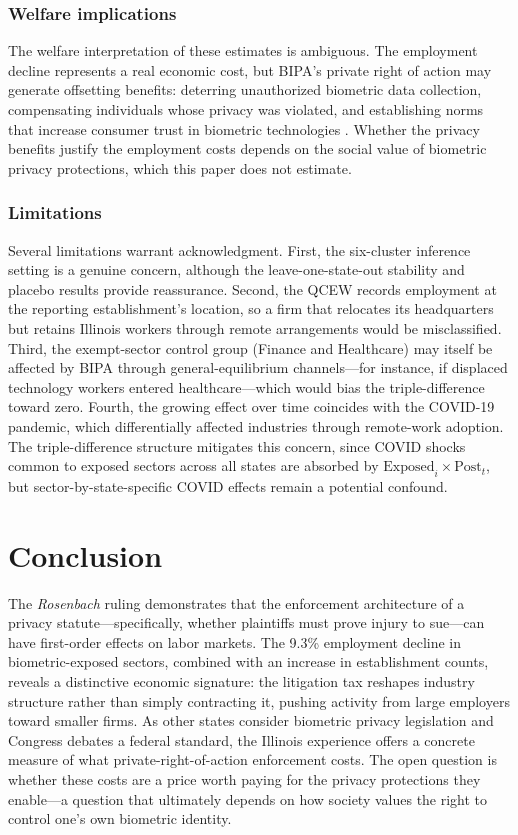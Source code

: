 \documentclass[12pt]{article}
\begin{document}
\subsubsection*{Welfare implications} The welfare interpretation of these estimates is ambiguous. The employment decline represents a real economic cost, but BIPA's private right of action may generate offsetting benefits: deterring unauthorized biometric data collection, compensating individuals whose privacy was violated, and establishing norms that increase consumer trust in biometric technologies \citep{acquisti2016, solove2021}. Whether the privacy benefits justify the employment costs depends on the social value of biometric privacy protections, which this paper does not estimate.

\subsubsection*{Limitations} Several limitations warrant acknowledgment. First, the six-cluster inference setting is a genuine concern, although the leave-one-state-out stability and placebo results provide reassurance. Second, the QCEW records employment at the reporting establishment's location, so a firm that relocates its headquarters but retains Illinois workers through remote arrangements would be misclassified. Third, the exempt-sector control group (Finance and Healthcare) may itself be affected by BIPA through general-equilibrium channels---for instance, if displaced technology workers entered healthcare---which would bias the triple-difference toward zero. Fourth, the growing effect over time coincides with the COVID-19 pandemic, which differentially affected industries through remote-work adoption. The triple-difference structure mitigates this concern, since COVID shocks common to exposed sectors across all states are absorbed by $\text{Exposed}_i \times \text{Post}_t$, but sector-by-state-specific COVID effects remain a potential confound.


\section{Conclusion}
\label{sec:conclusion}

The \emph{Rosenbach} ruling demonstrates that the enforcement architecture of a privacy statute---specifically, whether plaintiffs must prove injury to sue---can have first-order effects on labor markets. The 9.3\% employment decline in biometric-exposed sectors, combined with an increase in establishment counts, reveals a distinctive economic signature: the litigation tax reshapes industry structure rather than simply contracting it, pushing activity from large employers toward smaller firms. As other states consider biometric privacy legislation and Congress debates a federal standard, the Illinois experience offers a concrete measure of what private-right-of-action enforcement costs. The open question is whether these costs are a price worth paying for the privacy protections they enable---a question that ultimately depends on how society values the right to control one's own biometric identity.
\end{document}
